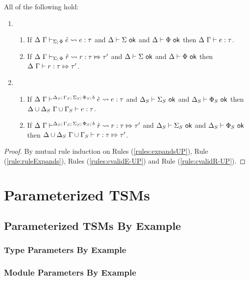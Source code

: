 {{{{\begin{theorem} All of the following hold:
\begin{enumerate}
  \item \begin{enumerate}
    \item If $\Delta~\Gamma \vdash_{\Sigma;\,\Phi} {\hat e} \leadsto e : \tau$ and $\Delta \vdash \Sigma~\mathsf{ok}$ and $\Delta \vdash \Phi~\mathsf{ok}$ then $\Delta~\Gamma \vdash e : \tau$.
    \item If $\Delta~\Gamma \vdash_{\Sigma;\,\Phi} \hat{r} \leadsto r : \tau \Mapsto \tau'$ and $\Delta \vdash \Sigma~\mathsf{ok}$ and $\Delta \vdash \Phi~\mathsf{ok}$ then $\Delta~\Gamma \vdash r : \tau \Mapsto \tau'$.
  \end{enumerate}
  \item \begin{enumerate}
    \item If $\Delta~\Gamma\vdash^{\Delta_S;\,\Gamma_S;\,\Sigma_S;\,\Phi_S;\,b} \grave{e} \leadsto e : \tau$ and $\Delta_S \vdash \Sigma_S~\mathsf{ok}$ and $\Delta_S \vdash \Phi_S~\mathsf{ok}$ then ${\Delta}\cup{\Delta_S}~{\Gamma}\cup{\Gamma_S} \vdash e : \tau$. 
    \item If $\Delta~\Gamma \vdash^{\Delta_S;\,\Gamma_S;\,\Sigma_S;\,\Phi_S;\,b} \grave{r} \leadsto r : \tau \Mapsto \tau'$ and $\Delta_S \vdash \Sigma_S~\mathsf{ok}$ and $\Delta_S \vdash \Phi_S~\mathsf{ok}$ then ${\Delta}\cup{\Delta_S}~{\Gamma}\cup{\Gamma_S} \vdash r : \tau \Mapsto \tau'$.
  \end{enumerate}
\end{enumerate}
\end{theorem}
\begin{proof}
  By mutual rule induction on Rules (\ref{rules:expandsUP}), Rule (\ref{rule:ruleExpands}), Rules (\ref{rules:cvalidE-UP}) and Rule (\ref{rule:cvalidR-UP}).
\end{proof}

\chapter{Parameterized TSMs}\label{sec:tsms-parameterized}
\section{Parameterized TSMs By Example}
\subsection{Type Parameters By Example}
\subsection{Module Parameters By Example}
}}}}
